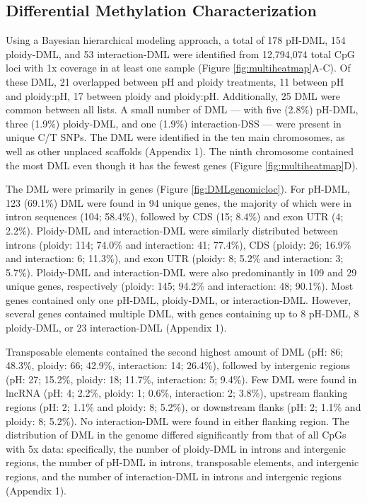 \documentclass [11pt, proquest] {uwthesis}[2015/03/03]
\begin{document}
\hypertarget{differential-methylation-characterization}{%
\subsection{Differential Methylation Characterization}\label{differential-methylation-characterization}}

Using a Bayesian hierarchical modeling approach, a total of 178 pH-DML, 154 ploidy-DML, and 53 interaction-DML were identified from 12,794,074 total CpG loci with 1x coverage in at least one sample (Figure \ref{fig:multiheatmap}A-C). Of these DML, 21 overlapped between pH and ploidy treatments, 11 between pH and ploidy:pH, 17 between ploidy and ploidy:pH. Additionally, 25 DML were common between all lists. A small number of DML --- with five (2.8\%) pH-DML, three (1.9\%) ploidy-DML, and one (1.9\%) interaction-DSS --- were present in unique C/T SNPs. The DML were identified in the ten main chromosomes, as well as other unplaced scaffolds (Appendix 1). The ninth chromosome contained the most DML even though it has the fewest genes (Figure \ref{fig:multiheatmap}D).

The DML were primarily in genes (Figure \ref{fig:DMLgenomicloc}). For pH-DML, 123 (69.1\%) DML were found in 94 unique genes, the majority of which were in intron sequences (104; 58.4\%), followed by CDS (15; 8.4\%) and exon UTR (4; 2.2\%). Ploidy-DML and interaction-DML were similarly distributed between introns (ploidy: 114; 74.0\% and interaction: 41; 77.4\%), CDS (ploidy: 26; 16.9\% and interaction: 6; 11.3\%), and exon UTR (ploidy: 8; 5.2\% and interaction: 3; 5.7\%). Ploidy-DML and interaction-DML were also predominantly in 109 and 29 unique genes, respectively (ploidy: 145; 94.2\% and interaction: 48; 90.1\%). Most genes contained only one pH-DML, ploidy-DML, or interaction-DML. However, several genes contained multiple DML, with genes containing up to 8 pH-DML, 8 ploidy-DML, or 23 interaction-DML (Appendix 1).

Transposable elements contained the second highest amount of DML (pH: 86; 48.3\%, ploidy: 66; 42.9\%, interaction: 14; 26.4\%), followed by intergenic regions (pH: 27; 15.2\%, ploidy: 18; 11.7\%, interaction: 5; 9.4\%). Few DML were found in lncRNA (pH: 4; 2.2\%, ploidy: 1; 0.6\%, interaction: 2; 3.8\%), upstream flanking regions (pH: 2; 1.1\% and ploidy: 8; 5.2\%), or downstream flanks (pH: 2; 1.1\% and ploidy: 8; 5.2\%). No interaction-DML were found in either flanking region. The distribution of DML in the genome differed significantly from that of all CpGs with 5x data: specifically, the number of ploidy-DML in introns and intergenic regions, the number of pH-DML in introns, transposable elements, and intergenic regions, and the number of interaction-DML in introns and intergenic regions (Appendix 1).
\end{document}
